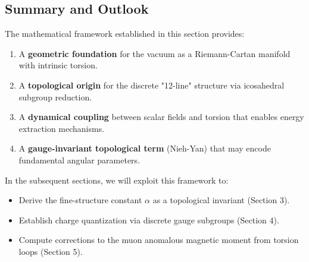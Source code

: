 \subsection{Summary and Outlook}

The mathematical framework established in this section provides:

\begin{enumerate}
    \item A \textbf{geometric foundation} for the vacuum as a Riemann-Cartan manifold with intrinsic torsion.
    \item A \textbf{topological origin} for the discrete "12-line" structure via icosahedral subgroup reduction.
    \item A \textbf{dynamical coupling} between scalar fields and torsion that enables energy extraction mechanisms.
    \item A \textbf{gauge-invariant topological term} (Nieh-Yan) that may encode fundamental angular parameters.
\end{enumerate}

In the subsequent sections, we will exploit this framework to:
\begin{itemize}
    \item Derive the fine-structure constant $\alpha$ as a topological invariant (Section 3).
    \item Establish charge quantization via discrete gauge subgroups (Section 4).
    \item Compute corrections to the muon anomalous magnetic moment from torsion loops (Section 5).
\end{itemize}